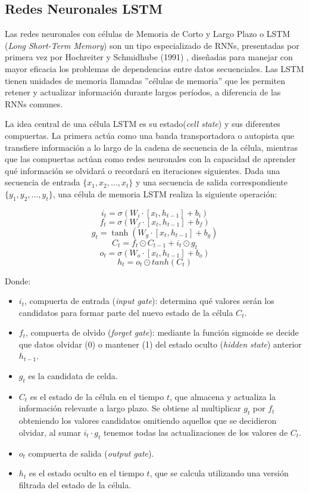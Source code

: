 \subsection{Redes Neuronales LSTM}

Las redes neuronales con células de Memoria de Corto y Largo Plazo o LSTM (\textit{Long Short-Term Memory}) son un tipo especializado de RNNs, presentadas por primera vez por Hochreiter y Schmidhube (1991) \cite{LSTM}, diseñadas para manejar con mayor eficacia los problemas de dependencias entre datos secuenciales. Las LSTM tienen unidades de memoria llamadas ''células de memoria'' que les permiten retener y actualizar información durante largos períodos, a diferencia de las RNNs comunes.

La idea central de una célula LSTM es su estado(\textit{cell state}) y sus diferentes compuertas. La primera actúa como una banda transportadora o autopista que transfiere información a lo largo de la cadena de secuencia de la célula, mientras que las compuertas actúan como redes neuronales con la capacidad de aprender qué información se olvidará o recordará en iteraciones siguientes.  Dada una secuencia de entrada $\{ x_1, x_2, \ldots, x_t \}$ y una secuencia de salida correspondiente $\{ y_1, y_2, \ldots, y_t \}$, una célula de memoria LSTM realiza la siguiente operación:

\[ i_t = \sigma(W_{i} \cdot [x_t, h_{t-1}] + b_i) \]
\[ f_t = \sigma(W_{f} \cdot [x_t, h_{t-1}] + b_f) \]
\[ g_t = \tanh(W_{g} \cdot [x_t, h_{t-1}] + b_g) \]
\[ C_t = f_t \odot C_{t-1} + i_t \odot g_t \]
\[ o_t = \sigma(W_{o} \cdot [x_t, h_{t-1}] + b_o) \]
\[ h_t = o_t \odot tanh(C_t) \]

Donde:
\begin{itemize}
    \item $i_t$, compuerta de entrada (\textit{input gate}): determina qué valores serán los candidatos para formar parte del nuevo estado de la célula $C_t$.
    \item $f_t$, compuerta de olvido (\textit{forget gate}): mediante la función sigmoide se decide que datos olvidar (0) o mantener (1) del estado oculto (\textit{hidden state}) anterior $h_{t-1}$.
    \item $g_t$ es la candidata de celda.
    \item $C_t$ es el estado de la célula en el tiempo $t$, que almacena y actualiza la información relevante a largo plazo. Se obtiene al multiplicar $g_t$ por $f_t$ obteniendo los valores candidatos omitiendo aquellos que se decidieron olvidar, al sumar $i_t \cdot g_t$ tenemos todas las actualizaciones de los valores de $C_t$.
    \item $o_t$ compuerta de salida (\textit{output gate}).
    \item $h_t$ es el estado oculto en el tiempo $t$, que se calcula utilizando una versión filtrada del estado de la célula.
\end{itemize}

